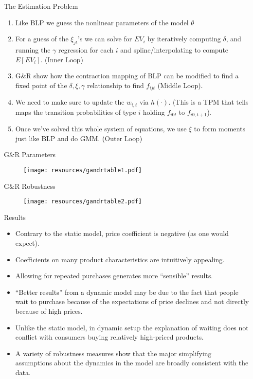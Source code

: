 \begin{frame}{The Estimation Problem}
\begin{enumerate}
\item Like BLP we guess the nonlinear parameters of the model $\theta$
\item For a guess of the $\xi_{jt}$'s we can solve for $EV_i$ by iteratively computing $\delta$, and running the $\gamma$ regression for each $i$ and spline/interpolating to compute $E[EV_i]$. (Inner Loop)
\item G\&R show how the contraction mapping of BLP can be modified to find a fixed point of the $\delta,\xi,\gamma$ relationship to find $f_{ijt}$ (Middle Loop).
\item We need to make sure to update the $w_{i,t}$ via $h(\cdot)$.  (This is a TPM that tells maps the transition probabilities of type $i$ holding $f_{i0t}$ to $f_{i0,t+1}$).
\item Once we've solved this whole system of equations, we use $\xi$ to form moments just like BLP and do GMM. (Outer Loop)
\end{enumerate}
\end{frame}

\begin{frame}{G\&R Parameters}
\begin{figure}[htbp]
\begin{center}
\texttt{[image: resources/gandrtable1.pdf]}
\end{center}
\end{figure}
\end{frame}

\begin{frame}{G\&R Robustness}
\begin{figure}[htbp]
\begin{center}
\texttt{[image: resources/gandrtable2.pdf]}
\end{center}
\end{figure}
\end{frame}


\begin{frame}{Results}
\begin{itemize}
\item Contrary to the static model, price coefficient is negative (as one would expect).
\item Coefficients on many product characteristics are intuitively appealing.
\item Allowing for repeated purchases generates more ``sensible'' results.
\item ``Better results'' from a dynamic model may be due to the fact that people wait to purchase because of the expectations of price declines and not directly because of high prices.
\item Unlike the static model, in dynamic setup the explanation of waiting does not conflict with consumers buying relatively high-priced products.
\item A variety of robustness measures show that the major simplifying assumptions about the dynamics in the model are broadly consistent with the data.
\end{itemize}
\end{frame}

